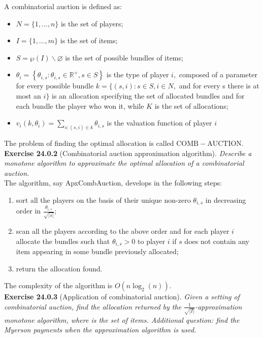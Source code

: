 A combinatorial auction is defined as:
\begin{itemize}
\item $N=\{1, \ldots, n\}$ is the set of players;
\item $I=\{1, \ldots, m\}$ is the set of items;
\item $ S=\wp(I) \backslash \varnothing$ is the set of possible bundles of items;
\item $\theta_{i}=\left\{\theta_{i, s}: \theta_{i, s} \in \mathbb{R}^{+}, s \in S\right\}$ is the type of player $i,$ composed of a parameter for every possible bundle
$k=\{(s, i): s \in S, i \in N,$ and for every s there is at most an $i\}$ is an allocation specifying the set of allocated bundles and for each bundle the player who won it, while $K$ is the set of allocations;
\item $v_{i}\left(k, \theta_{i}\right)=\sum_{s:(s, i) \in k} \theta_{i, s}$ is the valuation function of player $i$
\end{itemize}
The problem of finding the optimal allocation is called $\mathrm{COMB}-\mathrm{AUCTION}$.\\

\textbf{Exercise 24.0.2} (Combinatorial auction approximation algorithm). \textit{Describe a monotone algorithm to approximate the optimal allocation of a combinatorial auction.}\\

The algorithm, say ApxCombAuction, develops in the following steps:
\begin{enumerate}
\item sort all the players on the basis of their unique non-zero $\theta_{i,s}$ in decreasing order in $\frac{\theta_{i,s}}{\sqrt{|s|}}$;
\item scan all the players according to the above order and for each player $i$ allocate the bundles such that $\theta_{i,s} >0$ to player $i$ if $s$ does not contain any item appearing in some bundle previously allocated;
\item return the allocation found.
\end{enumerate}
The complexity of the algorithm is $O(n \log_2 (n))$.\\

\textbf{Exercise 24.0.3} (Application of combinatorial auction). \textit{Given a setting of combinatorial auction, find the allocation returned by the $\frac{1}{\sqrt{|I|}}$-approximation monotone algorithm, where is the set of items. Additional question: find the Myerson payments when the approximation algorithm is used.}\\

